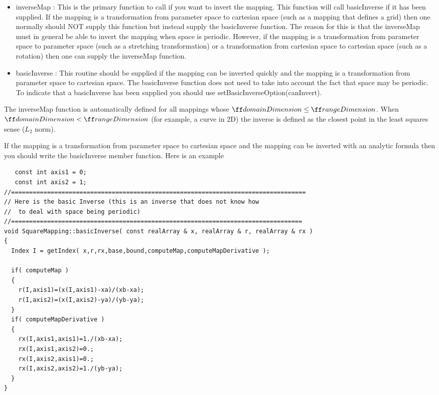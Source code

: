 \documentclass[xcolor=rgb,svgnames,dvipsnames]{article}
\begin{document}
\begin{itemize}
 \item {\ff inverseMap} : This is the primary function to call
if you want to invert the mapping. This function will call
{\ff basicInverse} if it has been supplied. If the mapping
is a transformation from parameter space to cartesian space
(such as a mapping that defines a grid) then one normally 
should NOT supply this function but instead supply the
{\ff basicInverse} function. The reason for this is that
the {\ff inverseMap} must in general be able to invert
the mapping when space is periodic.
However, if the mapping is a transformation from parameter
space to parameter space (such as a stretching transformation)
or a transformation from cartesian space to cartesian space
(such as a rotation) then one can supply the {\ff inverseMap}
function.

\item {\ff basicInverse} : This routine should be supplied
if the mapping can be inverted quickly and the mapping
is a transformation from parameter space to cartesian space.
The {\ff basicInverse} function does not need to take into 
account the fact that space may be periodic. To indicate that
a {\ff basicInverse} has been supplied you should use
{\ff setBasicInverseOption(canInvert)}. 
\end{itemize}




The {\ff inverseMap} function is automatically defined for all mappings
whose ${\ff domainDimension} \le {\ff rangeDimension}$. 
When ${\ff domainDimension} < {\ff rangeDimension}$ (for example,
a curve in 2D) the inverse is
defined as the closest point in the least squares sense ($L_2$ norm).


If the mapping is a transformation from parameter space to
cartesian space and the mapping can be inverted with an
analytic formula then you should write the {\ff basicInverse} member function.
Here is an example
{\footnotesize
\begin{verbatim}
   const int axis1 = 0;
   const int axis2 = 1;
//==================================================================================
// Here is the basic Inverse (this is an inverse that does not know how
//  to deal with space being periodic)
//=================================================================================
void SquareMapping::basicInverse( const realArray & x, realArray & r, realArray & rx )
{
  Index I = getIndex( x,r,rx,base,bound,computeMap,computeMapDerivative );

  if( computeMap )
  {
    r(I,axis1)=(x(I,axis1)-xa)/(xb-xa); 
    r(I,axis2)=(x(I,axis2)-ya)/(yb-ya); 
  }
  if( computeMapDerivative )
  {
    rx(I,axis1,axis1)=1./(xb-xa);
    rx(I,axis1,axis2)=0.;
    rx(I,axis2,axis1)=0.;
    rx(I,axis2,axis2)=1./(yb-ya);
  }
}
\end{verbatim}
}
\end{document}
